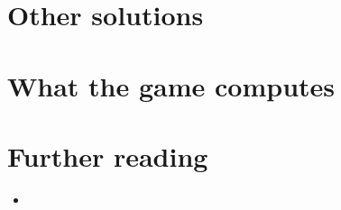 \documentclass{leveldoc}
\begin{document}
\section{Other solutions}\label{sec:others}


\section{What the game computes}\label{sec:engine}


\section{Further reading}\label{sec:reading}

\begin{itemize}
  \item
\end{itemize}

\levelfileappendix
\end{document}
